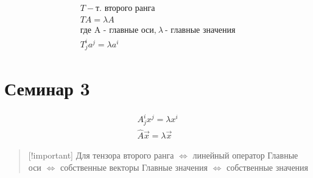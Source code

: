 $$\begin{gather}
T - \text{т. второго ранга} \\
TA = \lambda A \\
\text{где A - главные оси,} \ \lambda \ \text{- главные значения} \\
T^{i}_{j}a^{j} = \lambda a^{i}
\end{gather}$$

\section{Семинар 3}

$$\begin{gather}
A_{j}^{i}x^{j} = \lambda x^{i} \\
\hat{A} \vec{x} = \lambda \vec{x}
\end{gather}$$

\begin{quote}
{[}!important{]} Для тензора второго ранга \(\iff\) линейный оператор
Главные оси \(\iff\) собственные векторы Главные значения \(\iff\)
собственные значения
\end{quote}

